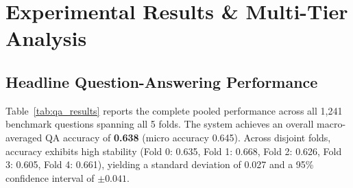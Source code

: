\documentclass[11pt,a4paper]{article}
\begin{document}
\section{Experimental Results \& Multi-Tier Analysis}
\label{sec:results}

\subsection{Headline Question-Answering Performance}
Table~\ref{tab:qa_results} reports the complete pooled performance across all 1,241 benchmark questions spanning all 5 folds. The system achieves an overall macro-averaged QA accuracy of \textbf{0.638} (micro accuracy 0.645). Across disjoint folds, accuracy exhibits high stability (Fold 0: 0.635, Fold 1: 0.668, Fold 2: 0.626, Fold 3: 0.605, Fold 4: 0.661), yielding a standard deviation of 0.027 and a 95\% confidence interval of $\pm 0.041$.

\begin{table}[t]
\centering
\small
\caption{\textbf{Final Pooled End-to-End QA Benchmark Performance.} 1,241 total questions evaluated across 57 held-out real recordings spanning all 60 ExtraSensory users (official 5-fold CV). Overall score is macro-averaged across question types.}
\label{tab:qa_results}
\end{table}
\end{document}
